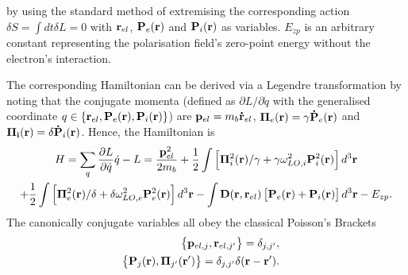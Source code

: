by using the standard method of extremising the corresponding action $\delta S = \int dt \delta L = 0$ with $\vb{r}_{el}$, $\vb{P}_e(\vb{r})$ and $\vb{P}_i(\vb{r})$ as variables. $E_{zp}$ is an arbitrary constant representing the polarisation field's zero-point energy without the electron's interaction. 

The corresponding Hamiltonian can be derived via a Legendre transformation by noting that the conjugate momenta (defined as $\partial L/\partial\dot{q}$ with the generalised coordinate $q \in \{\vb{r}_{el},  \vb{P}_e(\vb{r}), \vb{P}_i(\vb{r})\}$) are $\vb{p}_{el} = m_b \vb{\dot{r}}_{el}$, $\vb{\Pi}_e(\vb{r}) = \gamma \vb{\dot{P}}_e(\vb{r})$ and $\vb{\Pi_i(\vb{r})} = \delta \vb{\dot{P}}_i (\vb{r})$. Hence, the Hamiltonian is
\begin{equation}
    \begin{gathered}
        H = \sum_{q} \frac{\partial L}{\partial \dot{q}} \dot{q} - L = \frac{\vb{p}_{el}^2}{2 m_b} + \frac{1}{2} \int \left[\vb{\Pi}_{i}^2(\vb{r})/\gamma + \gamma\omega_{LO, i}^2 \vb{P}^2_i (\vb{r}) \right]
        d^3 \vb{r} 
        \\ + \frac{1}{2} \int \left[\vb{\Pi}_{e}^2(\vb{r})/\delta + \delta\omega_{LO, e}^2 \vb{P}^2_e (\vb{r}) \right] d^3 \vb{r} - \int \vb{D}(\vb{r},\vb{r}_{el})\left[\vb{P}_e(\vb{r})+\vb{P}_i(\vb{r})\right] d^3\vb{r} - E_{zp}.
    \end{gathered}
\label{eqn-2121-14}
\end{equation}
The canonically conjugate variables all obey the classical Poisson's Brackets
\begin{subequations}
\begin{align}
    \begin{split}
        \left\{\vb{p}_{el, j}, \vb{r}_{el, j'}\right\} &= \delta_{j, j'},
    \end{split}\\
    \begin{split}
        \left\{\vb{P}_{j}(\vb{r}), \vb{\Pi}_{j'}(\vb{r'})\right\} &= \delta_{j, j'} \delta(\vb{r}-\vb{r'}).
    \end{split}
\end{align}
\label{eqn-2121-15}
\end{subequations}
